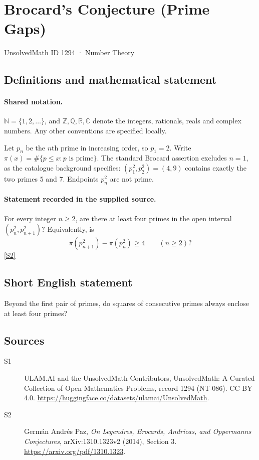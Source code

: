 \documentclass[11pt]{article}
\newcommand{\sref}[2]{\hyperlink{source:#1:#2}{[S#2]}}
\begin{document}
\setcounter{section}{1293}
\section{Brocard's Conjecture (Prime Gaps)}\label{1294}
{\small\sffamily UnsolvedMath ID 1294 · Number Theory}
\subsection{Definitions and mathematical statement}

\paragraph{Shared notation.}$\mathbb N=\{1,2,\ldots\}$, and $\mathbb Z,\mathbb Q,\mathbb R,\mathbb C$ denote the integers, rationals, reals and complex numbers. Any other conventions are specified locally.


Let $p_n$ be the $n$th prime in increasing order, so $p_1=2$. Write $\pi(x)=\#\{p\leq x:p\text{ is prime}\}$. The standard Brocard assertion excludes $n=1$, as the catalogue background specifies: $(p_1^2,p_2^2)=(4,9)$ contains exactly the two primes $5$ and $7$. Endpoints $p_n^2$ are not prime.
\paragraph{Statement recorded in the supplied source.}
For every integer $n\geq2$, are there at least four primes in the open interval $(p_n^2,p_{n+1}^2)$? Equivalently, is
\[
\pi(p_{n+1}^2)-\pi(p_n^2)\geq4\qquad(n\geq2)?
\] \sref{1294}{2}

\subsection{Short English statement}
Beyond the first pair of primes, do squares of consecutive primes always enclose at least four primes?
\subsection{Sources}
\begin{description}
\item[\hypertarget{source:1294:1}{S1}] ULAM.AI and the UnsolvedMath Contributors, UnsolvedMath: A Curated Collection of Open Mathematics Problems, record 1294 (NT-086). CC BY 4.0. \url{https://huggingface.co/datasets/ulamai/UnsolvedMath}.
\item[\hypertarget{source:1294:2}{S2}] Germ\'{a}n Andr\'{e}s Paz, \emph{On Legendre\textquotesingle s, Brocard\textquotesingle s, Andrica\textquotesingle s, and Oppermann\textquotesingle s Conjectures}, arXiv:1310.1323v2 (2014), Section 3. \url{https://arxiv.org/pdf/1310.1323}.
\end{description}
\label{end:1294}
\end{document}
